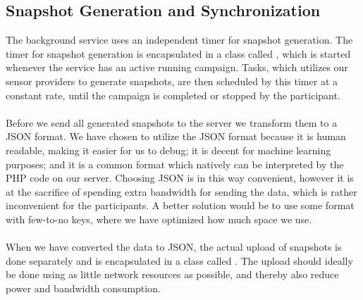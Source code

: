 \subsection{Snapshot Generation and Synchronization}
\label{sub:background_sensor_service_snapshot_generation_and_synchronization}


The background service uses an independent timer for snapshot generation. The timer for snapshot generation is encapsulated in a class called , which is started whenever the service has an active running campaign. Tasks, which utilizes our sensor providers to generate snapshots, are then scheduled by this timer at a constant rate, until the campaign is completed or stopped by the participant.
\\\\
Before we send all generated snapshots to the server we transform them to a JSON format. We have chosen to utilize the JSON format because it is human readable, making it easier for us to debug; it is decent for machine learning purposes; and it is a common format which natively can be interpreted by the PHP code on our server. Choosing JSON is in this way convenient, however it is at the sacrifice of spending extra bandwidth for sending the data, which is rather inconvenient for the participants. A better solution would be to use some format with few-to-no keys, where we have optimized how much space we use. 
\\\\
When we have converted the data to JSON, the actual upload of snapshots is done separately and is encapsulated in a class called . The upload should ideally be done using as little network resources as possible, and thereby also reduce power and bandwidth consumption. 


